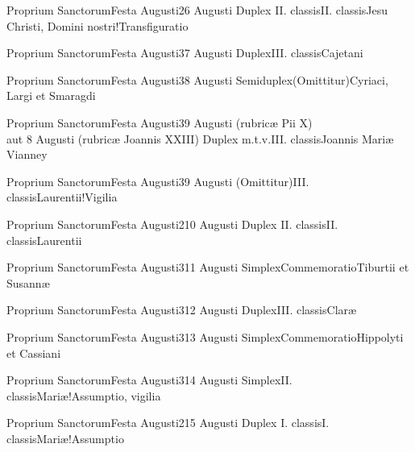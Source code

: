 \documentclass[psalterium-feriale.tex]{subfiles}
\begin{document}
	{Proprium Sanctorum}{Festa Augusti}{2}{6 Augusti}
	{Duplex II. classis}{II. classis}{Jesu Christi, Domini nostri!Transfiguratio}
	{}
	{}
\psalmodiapropria

	{Proprium Sanctorum}{Festa Augusti}{3}{7 Augusti}
	{Duplex}{III. classis}{Cajetani}
	{}
	{}
\COPObRubric

	{Proprium Sanctorum}{Festa Augusti}{3}{8 Augusti}
	{Semiduplex}{(Omittitur)}{Cyriaci, Largi et Smaragdi}
	{}
	{}
\PMEXaRubric

	{Proprium Sanctorum}{Festa Augusti}{3}{9 Augusti (rubricæ Pii X)\\aut 8 Augusti (rubricæ Joannis XXIII)}
	{Duplex m.t.v.}{III. classis}{Joannis Mariæ Vianney}
	{}
	{}
\COPOcRubric

	{Proprium Sanctorum}{Festa Augusti}{3}{9 Augusti}
	{(Omittitur)}{III. classis}{Laurentii!Vigilia}
	{}
	{}
\feriaRubric

	{Proprium Sanctorum}{Festa Augusti}{2}{10 Augusti}
	{Duplex II. classis}{II. classis}{Laurentii}
	{}
	{}
\psalmodiapropria

	{Proprium Sanctorum}{Festa Augusti}{3}{11 Augusti}
	{Simplex}{Commemoratio}{Tiburtii et Susannæ}
	{}
	{}
\PMEXaRubric

	{Proprium Sanctorum}{Festa Augusti}{3}{12 Augusti}
	{Duplex}{III. classis}{Claræ}
	{}
	{}
\MUVNbRubric

	{Proprium Sanctorum}{Festa Augusti}{3}{13 Augusti}
	{Simplex}{Commemoratio}{Hippolyti et Cassiani}
	{}
	{}
\PMEXaRubric

	{Proprium Sanctorum}{Festa Augusti}{3}{14 Augusti}
	{Simplex}{II. classis}{Mariæ!Assumptio, vigilia}
	{}
	{}
\feriaRubric

	{Proprium Sanctorum}{Festa Augusti}{2}{15 Augusti}
	{Duplex I. classis}{I. classis}{Mariæ!Assumptio}
	{}
	{}
\psalmodiapropria

\end{document}
